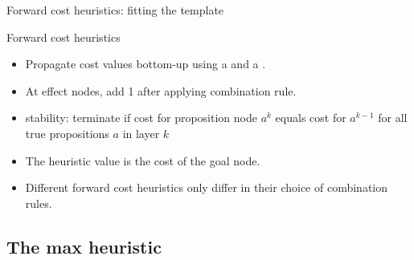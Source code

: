 \documentclass{gkibeamer}
\begin{document}
\begin{frame}{Forward cost heuristics: fitting the template}
  \begin{block}{Forward cost heuristics}
    \begin{itemize}
    \item Propagate cost values bottom-up using a  and a .
    \item At \alert{effect nodes}, \alert{add 1} after applying
      combination rule.
    \end{itemize}

    \begin{itemize}
    \item \alert{stability:} terminate if cost for proposition node
      $a^k$ equals cost for $a^{k-1}$ for all true propositions $a$ in
      layer $k$
    \end{itemize}
    
    \begin{itemize}
    \item The heuristic value is the cost of the goal node.
    \end{itemize}
  \end{block}
  \begin{itemize}
  \item Different forward cost heuristics only differ in their choice
    of combination rules.
  \end{itemize}
\end{frame}

\subsection[\hmax]{The max heuristic \hmax}
\end{document}
